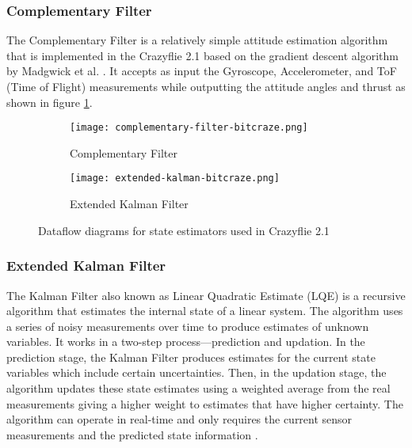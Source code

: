 \documentclass[10pt, a4paper]{article}
\begin{document}
    \subsubsection{Complementary Filter}
    The Complementary Filter is a relatively simple attitude estimation algorithm that is implemented in the Crazyflie 2.1 based on the gradient descent algorithm by Madgwick et al. \cite{article:complementary-filter}. It accepts as input the Gyroscope, Accelerometer, and ToF (Time of Flight) measurements while outputting the attitude angles and thrust as shown in figure \ref{figure:complementary-filter-bitcraze}.

    \begin{figure}[hbt!]
        \centering
        \begin{subfigure}[b]{0.49\textwidth}
            \centering
            \texttt{[image: complementary-filter-bitcraze.png]}
            \caption{Complementary Filter}
            \label{figure:complementary-filter-bitcraze}
        \end{subfigure}
        \begin{subfigure}[b]{0.49\textwidth}
            \centering
            \texttt{[image: extended-kalman-bitcraze.png]}
            \caption{Extended Kalman Filter}
            \label{figure:extended-kalman-bitcraze}
        \end{subfigure}
        \caption{Dataflow diagrams for state estimators used in Crazyflie 2.1 \cite{web:stateEstimator/bitcraze}}
        \label{figure:State-Estimator-bitcraze}
    \end{figure}

    \subsubsection{Extended Kalman Filter}
    The Kalman Filter also known as Linear Quadratic Estimate (LQE) is a recursive algorithm that estimates the internal state of a linear system. The algorithm uses a series of noisy measurements over time to produce estimates of unknown variables. It works in a two-step process---prediction and updation. In the prediction stage, the Kalman Filter produces estimates for the current state variables which include certain uncertainties. Then, in the updation stage, the algorithm updates these state estimates using a weighted average from the real measurements giving a higher weight to estimates that have higher certainty. The algorithm can operate in real-time and only requires the current sensor measurements and the predicted state information \cite{book:quan2017-KF}.
\end{document}
